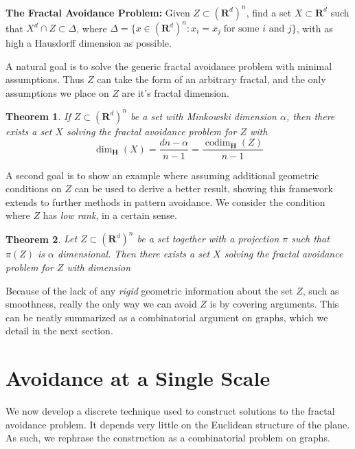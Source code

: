 \documentclass{article}
\theoremstyle{plain}
\theoremstyle{plain}
\newtheorem{theorem}{Theorem}
\DeclareMathOperator{\codim}{codim}
\begin{document}
\begin{multicols}{2}
\begin{changemargin}{0.5em}{0em}
	{\bf The Fractal Avoidance Problem:} Given $Z \subset (\mathbf{R}^d)^n$, find a set $X \subset \mathbf{R}^d$ such that $X^d \cap Z \subset \Delta$, where $\Delta = \{ x \in (\mathbf{R}^d)^n : x_i = x_j\; \text{for some $i$ and $j$} \}$, with as high a Hausdorff dimension as possible.
\end{changemargin}

A natural goal is to solve the generic fractal avoidance problem with minimal assumptions. Thus $Z$ can take the form of an arbitrary fractal, and the only assumptions we place on $Z$ are it's fractal dimension.

\begin{theorem}
	If $Z \subset (\mathbf{R}^d)^n$ be a set with Minkowski dimension $\alpha$, then there exists a set $X$ solving the fractal avoidance problem for $Z$ with
	\[ \dim_{\mathbf{H}}(X) = \frac{dn - \alpha}{n - 1} = \frac{\codim_{\mathbf{H}}(Z)}{n - 1} \]
\end{theorem}


A second goal is to show an example where assuming additional geometric conditions on $Z$ can be used to derive a better result, showing this framework extends to further methods in pattern avoidance. We consider the condition where $Z$ has {\it low rank}, in a certain sense.

\begin{theorem}
	Let $Z \subset (\mathbf{R}^d)^n$ be a set together with a projection $\pi$ such that $\pi(Z)$ is $\alpha$ dimensional. Then there exists a set $X$ solving the fractal avoidance problem for $Z$ with dimension
\end{theorem}

Because of the lack of any {\it rigid} geometric information about the set $Z$, such as smoothness, really the only way we can avoid $Z$ is by covering arguments. This can be neatly summarized as a combinatorial argument on graphs, which we detail in the next section.

\section{Avoidance at a Single Scale}

We now develop a discrete technique used to construct solutions to the fractal avoidance problem. It depends very little on the Euclidean structure of the plane. As such, we rephrase the construction as a combinatorial problem on graphs.


\end{multicols}
\end{document}
